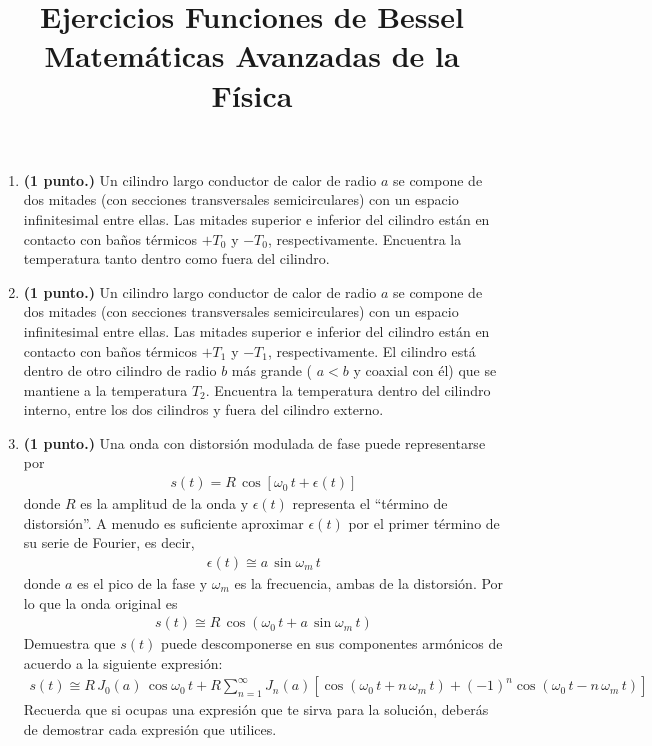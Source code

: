 
\title{Ejercicios Funciones de Bessel\\ \large {Matemáticas Avanzadas de la Física}  \vspace{-1.5\baselineskip}}
\date{}
\author{}

\renewcommand\labelenumii{\theenumi.{\arabic{enumii})}}
\maketitle
\fontsize{14}{14}\selectfont
\begin{enumerate}
\item \textbf{(1 punto.) } Un cilindro largo conductor de calor de radio $a$ se compone de dos mitades (con secciones transversales semicirculares) con un espacio infinitesimal entre ellas. Las mitades superior e inferior del cilindro están en contacto con baños térmicos $+T_{0}$ y $-T_{0}$, respectivamente. Encuentra la temperatura tanto dentro como fuera del cilindro.
\item \textbf{(1 punto.) } Un cilindro largo conductor de calor de radio $a$ se compone de dos mitades (con secciones transversales semicirculares) con un espacio infinitesimal entre ellas. Las mitades superior e inferior del cilindro están en contacto con baños térmicos $+T_{1}$ y $-T_{1}$, respectivamente. El cilindro está dentro de otro cilindro de radio $b$ más grande ( $a < b$ y coaxial con él) que se mantiene a la temperatura $T_{2}$. Encuentra la temperatura dentro del cilindro interno, entre los dos cilindros y fuera del cilindro externo.
\item \textbf{(1 punto.) } Una onda con distorsión modulada de fase puede representarse por
\begin{align*}
s(t) = R \, \cos [ \omega_{0} \, t +  \epsilon (t)]
\end{align*}
donde $R$ es la amplitud de la onda y $\epsilon(t)$ representa el \enquote{término de distorsión}. A menudo es suficiente aproximar $\epsilon (t)$ por el primer término de su serie de Fourier, es decir,
\begin{align*}
\epsilon (t) \cong a \, \sin \omega_{m} \, t
\end{align*}
donde $a$ es el pico de la fase y $\omega_{m}$ es la frecuencia, ambas de la distorsión. Por lo que la onda original es
\begin{align*}
s(t) \cong R \, \cos (\omega_{0} \, t + a \, \sin \omega_{m} \, t)
\end{align*}
Demuestra que $s(t)$ puede descomponerse en sus componentes armónicos de acuerdo a la siguiente expresión:
\begin{align*}
s(t) \cong R \, J_{0}(a) \, \cos \omega_{0} \, t + R \sum_{n=1}^{\infty} J_{n} (a) [\cos (\omega_{0} \, t + n \, \omega_{m} \, t) + (-1)^{n} \cos (\omega_{0} \, t - n \, \omega_{m} \, t) ]
\end{align*}
Recuerda que si ocupas una expresión que te sirva para la solución, deberás de demostrar cada expresión que utilices.
\end{enumerate}
